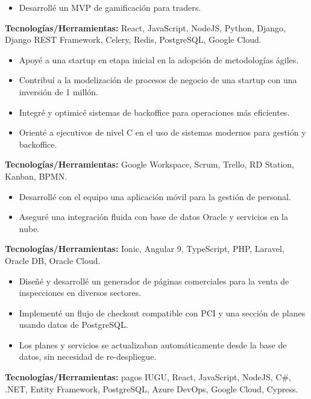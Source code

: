 \documentclass[10pt,a4paper]{altacv}
\begin{document}
\begin{itemize}
    \setlength{\itemindent}{0.5em}
    \item[--] Desarrollé un MVP de gamificación para traders.
\end{itemize}
\textbf{Tecnologías/Herramientas:} React, JavaScript, NodeJS, Python, Django, Django REST Framework, Celery, Redis, PostgreSQL, Google Cloud.
\vspace{5mm}

\begin{itemize}
    \setlength{\itemindent}{0.5em}
    \item[--] Apoyé a una startup en etapa inicial en la adopción de metodologías ágiles.
    \item[--] Contribuí a la modelización de procesos de negocio de una startup con una inversión de 1 millón.
    \item[--] Integré y optimicé sistemas de backoffice para operaciones más eficientes.
    \item[--] Orienté a ejecutivos de nivel C en el uso de sistemas modernos para gestión y backoffice.
\end{itemize}
\textbf{Tecnologías/Herramientas:} Google Workspace, Scrum, Trello, RD Station, Kanban, BPMN.
\vspace{5mm}

\begin{itemize}
    \setlength{\itemindent}{0.5em}
    \item[--] Desarrollé con el equipo una aplicación móvil para la gestión de personal.
    \item[--] Aseguré una integración fluida con base de datos Oracle y servicios en la nube.
\end{itemize}
\textbf{Tecnologías/Herramientas:} Ionic, Angular 9, TypeScript, PHP, Laravel, Oracle DB, Oracle Cloud.
\vspace{5mm}

\begin{itemize}
    \setlength{\itemindent}{0.5em}
    \item[--] Diseñé y desarrollé un generador de páginas comerciales para la venta de inspecciones en diversos sectores.
    \item[--] Implementé un flujo de checkout compatible con PCI y una sección de planes usando datos de PostgreSQL.
    \item[--] Los planes y servicios se actualizaban automáticamente desde la base de datos, sin necesidad de re-despliegue.
\end{itemize}
\textbf{Tecnologías/Herramientas:} pagos IUGU, React, JavaScript, NodeJS, C\#, .NET, Entity Framework, PostgreSQL, Azure DevOps, Google Cloud, Cypress.
\end{document}
